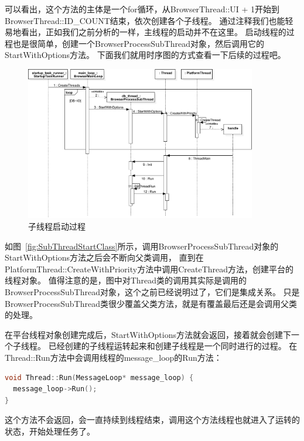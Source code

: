 可以看出，这个方法的主体是一个for循环，从BrowserThread::UI + 1开始到BrowserThread::ID_COUNT结束，依次创建各个子线程。
通过注释我们也能轻易地看出，正如我们之前分析的一样，主线程的启动并不在这里。
启动线程的过程也是很简单，创建一个BrowserProcessSubThread对象，然后调用它的StartWithOptions方法。
下面我们就用时序图的方式查看一下后续的过程吧。

\begin{figure}[H] 
  \centering 
  \includegraphics[width=0.90\textwidth]{image/process_study/SubThreadStartSuquence.pdf} 
  \caption{子线程启动过程} \label{fig:SubThreadStartSuquence} 
\end{figure}

如图~\ref{fig:SubThreadStartClass}所示，调用BrowserProcessSubThread对象的StartWithOptions方法之后会不断向父类调用，
直到在 PlatformThread::CreateWithPriority方法中调用CreateThread方法，创建平台的线程对象。
值得注意的是，图中对Thread类的调用其实际是调用的BrowserProcessSubThread对象，这个之前已经说明过了，它们是集成关系。
只是BrowserProcessSubThread类很少覆盖父类方法，就是有覆盖最后还是会调用父类的处理。

在平台线程对象创建完成后，StartWithOptions方法就会返回，接着就会创建下一个子线程。
已经创建的子线程运转起来和创建子线程是一个同时进行的过程。
在Thread::Run方法中会调用线程的message_loop的Run方法：
\begin{spacing}{1.0}
\begin{lstlisting}[language={C++}]
void Thread::Run(MessageLoop* message_loop) {
  message_loop->Run();
}
\end{lstlisting}
\end{spacing}
这个方法不会返回，会一直持续到线程结束，调用这个方法线程也就进入了运转的状态，开始处理任务了。

%
%
%
